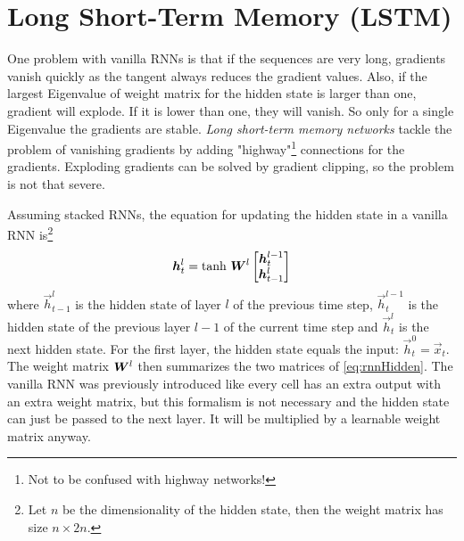 	\section{Long Short-Term Memory (LSTM)}
		One problem with vanilla RNNs is that if the sequences are very long, gradients vanish quickly as the tangent always reduces the gradient values. Also, if the largest Eigenvalue of weight matrix for the hidden state is larger than one, gradient will explode. If it is lower than one, they will vanish. So only for a single Eigenvalue the gradients are stable. \emph{Long short-term memory networks} tackle the problem of vanishing gradients by adding "highway"\footnote{Not to be confused with highway networks!} connections for the gradients. Exploding gradients can be solved by gradient clipping, so the problem is not that severe.

		Assuming stacked RNNs, the equation for updating the hidden state in a vanilla RNN is\footnote{Let \(n\) be the dimensionality of the hidden state, then the weight matrix has size \( n \times 2n \).}
		\begin{equation}
			\bm{h}_t^l = \tanh\,
				\bm{W}^l
				\begin{bmatrix}
					\bm{h}_t^{l - 1} \\
					\bm{h}_{t - 1}^l
				\end{bmatrix}
		\end{equation}
		where \( \vec{h}_{t - 1}^l \) is the hidden state of layer \(l\) of the previous time step, \( \vec{h}_t^{l - 1} \) is the hidden state of the previous layer \(l - 1\) of the current time step and \(\vec{h}_t^l\) is the next hidden state. For the first layer, the hidden state equals the input: \( \vec{h}_t^0 = \vec{x}_t \). The weight matrix \( \bm{W}^l \) then summarizes the two matrices of \eqref{eq:rnnHidden}. The vanilla RNN was previously introduced like every cell has an extra output with an extra weight matrix, but this formalism is not necessary and the hidden state can just be passed to the next layer. It will be multiplied by a learnable weight matrix anyway.

